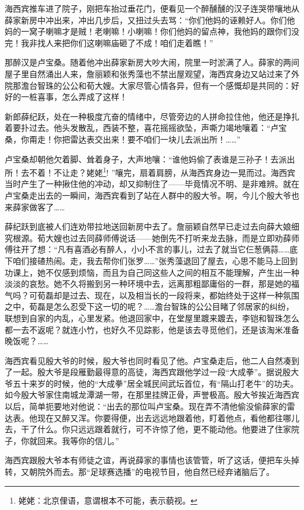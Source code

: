 \par 海西宾推车进了院子，刚把车抬过垂花门，便看见一个醉醺醺的汉子连哭带嚷地从薛家新房中冲出来，冲出几步后，又扭过头去骂：“你们他妈的诬赖好人。你们他妈的一窝子喇嘛才是贼！老喇嘛！小喇嘛！你们他妈的留点神，我他妈的跟你们没完！我非找人来把你们这喇嘛庙砸了不成！咱们走着瞧！”
\par 那醉汉是卢宝桑。随着他冲出薛家新房大吵大闹，院里一时淤满了人。薛家的两间屋子里自然涌出人来，詹丽颖和张秀藻也不禁出屋观望，海西宾身边又站过来了外院那澹台智珠的公公和荀大嫂。大家尽管心情各异，但有一个感慨却是共同的：好好的一桩喜事，怎么弄成了这样！
\par 新郎薛纪跃，处在一种极度亢奋的情绪中，尽管旁边的人拼命拉住他，他还是挣扎着要扑过去。他头发散乱，西装不整，喜花摇摇欲坠，声嘶力竭地嚷着：“卢宝桑，你甭走！你把雷达表交出来！要不咱们一块儿去派出所！……”
\par 卢宝桑却朝他欠着脚、耸着身子，大声地嚷：“谁他妈偷了表谁是三孙子！去派出所！去不着！不让走？姥姥\footnote{姥姥：北京俚语，意谓根本不可能，表示藐视。}! ”嚷完，扇着肩膀，从海西宾身边一晃而过。海西宾当时产生了一种揪住他的冲动，却又抑制住了——毕竟情况不明、是非难辨。就在卢宝桑走出去的一瞬间，海西宾看到了站在人群中的殷大爷。啊，今儿个殷大爷也来薛家做客了……
\par 薛纪跃到底被人们连劝带拉地送回新房中去了。詹丽颖自然早已走过去向薛大娘细究根源。荀大嫂也过去同薛师傅说话——她倒先不打听来龙去脉，而是立即劝薛师傅往开了想：“凡有喜酒必有醉人，小小不言的事儿，过去了就当它仨葱俩蒜……底下咱们接碴热闹。走，我去帮你们张罗……”张秀藻退回了屋去，心思不能马上回到功课上，她不仅感到烦恼，而且为自己同这些人之间的相互不能理解，产生出一种淡淡的哀愁。她不久将搬到另一种环境中去，远离那粗鄙庸俗的一群，那是她的福气吗？可荀磊却是过去、现在，以及相当长的一段将来，都始终处于这样一种氛围之中，荀磊是怎么忍受下这一切的呢？……澹台智珠的公公目睹了邻居家的纠纷，联想到自家的内乱，心里发紧。他退回家中，在堂屋里踱来踱去，李铠和智珠怎么都一去不返呢？就连小竹，也好久不见踪影，他是该去寻觅他们，还是该淘米准备晚饭呢？……
\par 海西宾看见殷大爷的时候，殷大爷也同时看见了他。卢宝桑走后，他二人自然凑到了一起。殷大爷是段雁勤最得意的高徒，海西宾跟他学过一段“大成拳”。据说殷大爷五十来岁的时候，他的“大成拳”居全城民间武坛首位，有“隔山打老牛”的功夫。如今殷大爷家住南城龙潭湖一带，在那里挂牌正骨，声誉极高。殷大爷挨近海西宾以后，简单扼要地对他说：“出去的那位叫卢宝桑。现在弄不清他偷没偷薛家的雷达表。他现在又醉又浑。你要得便，出去远远地跟着他，盯着他点，看他都往哪儿去，干了什么。你只远远跟着就行，可不许惊了他，更不能动他。他要进了住家院子，你就回来。我等你的信儿。”
\par 海西宾跟殷大爷本有师徒之谊，再说薛家的事情也该管管，听了这话，便把车头掉转，又朝院外而去。那“足球赛选播”的电视节目，他自然已经弃诸脑后了。


